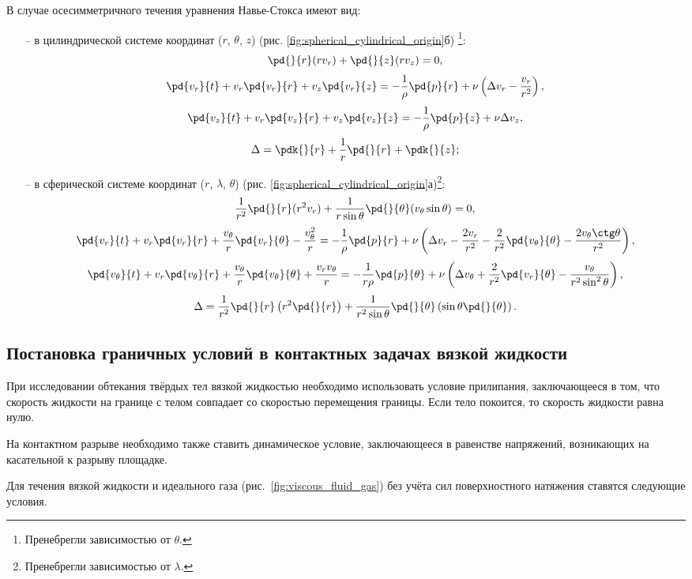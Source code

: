 \documentclass[14pt]{extarticle}
\begin{document}
В случае \alert{осесимметричного течения} уравнения Навье-Стокса имеют вид:
\begin{itemize}
	\item[--] в цилиндрической системе координат ($r$, $\theta$, $z$) (рис. \ref{fig:spherical_cylindrical_origin}б) \footnote{Пренебрегли зависимостью от $\theta$.}:
\[
\pd{}{r} (r v_r) + \pd{}{z} (r v_z) = 0,
\]
\[
\pd{v_r}{t} + v_r\pd{v_r}{r} + v_z\pd{v_r}{z} = -\frac{1}{\rho} \pd{p}{r} + \nu \left(\Delta v_r - \frac{v_r}{r^2}\right),
\]
\[
\pd{v_z}{t} + v_r\pd{v_z}{r} + v_z\pd{v_z}{z} = -\frac{1}{\rho} \pd{p}{z} + \nu \Delta v_z,
\]
\[
\Delta = \pdk{}{r}+\frac{1}{r}\pd{}{r} + \pdk{}{z};
\]
	\item[--] в сферической системе координат ($r$,  $\lambda$, $\theta$) (рис. \ref{fig:spherical_cylindrical_origin}а)\footnote{Пренебрегли зависимостью от $\lambda$.}:
\[
\frac{1}{r^2} \pd{}{r}(r^2 v_r) + \frac{1}{r \sin \theta} \pd{}{\theta}(v_\theta \sin\theta) = 0,
\]
\[
\pd{v_r}{t} + v_r\pd{v_r}{r} + \frac{v_\theta}{r} \pd{v_r}{\theta} - \frac{v_\theta^2}{r} = -\frac{1}{\rho} \pd{p}{r} + 
\nu \left(\Delta v_r - \frac{2 v_r}{r^2} - \frac{2}{r^2}\pd{v_\theta}{\theta} - \frac{2 v_\theta \ctg\theta}{r^2}\right),
\]
\[
\pd{v_\theta}{t} + v_r\pd{v_\theta}{r} + \frac{v_\theta}{r} \pd{v_\theta}{\theta} + \frac{v_r v_\theta}{r} = 
-\frac{1}{r \rho} \pd{p}{\theta} + 
\nu \left(\Delta v_\theta + \frac{2}{r^2}\pd{v_r}{\theta} - \frac{v_\theta}{r^2 \sin^2 \theta}\right),
\]
\[
\Delta = \frac{1}{r^2} \pd{}{r}\left(r^2\pd{}{r}\right) + \frac{1}{r^2 \sin\theta} \pd{}{\theta} \left(\sin\theta \pd{}{\theta}\right).
\]
\end{itemize}

\subsection{Постановка граничных условий в контактных задачах вязкой жидкости}

При исследовании обтекания твёрдых тел вязкой жидкостью необходимо использовать условие \alert{прилипания}, заключающееся в том, что скорость жидкости на границе с телом совпадает со скоростью перемещения границы. Если тело покоится, то скорость жидкости равна нулю.

На \alert{контактном разрыве} необходимо также ставить динамическое ус\-ло\-вие, заключающееся в равенстве напряжений, возникающих на касательной к разрыву площадке.

Для течения вязкой жидкости и идеального газа (рис.~\ref{fig:viscous_fluid_gas}) без учёта сил поверхностного натяжения ставятся следующие условия.
\end{document}
